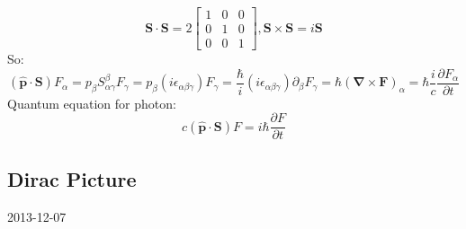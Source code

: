 \documentclass[12pt]{article}
\numberwithin{equation}{section}
\begin{document}
\begin{enumerate}
\begin{equation}
	\end{equation}
	\begin{equation}
		\bm{S}\cdot\bm{S}= 2\begin{bmatrix}1&0&0\\0&1&0\\0&0&1\end{bmatrix},
		\bm{S}\times\bm{S}= i\bm{S}
	\end{equation}
	So:
	\begin{equation}
		(\hat{\bm{p}}\cdot\bm{S})F_\alpha=p_\beta S^\beta_{\alpha\gamma}F_\gamma
		=p_\beta(i\epsilon_{\alpha\beta\gamma})F_\gamma
		=\frac{\hbar}{i}(i\epsilon_{\alpha\beta\gamma})\partial_\beta F_\gamma
		=\hbar(\bm{\nabla}\times\bm{F})_\alpha
		=\hbar\frac{i}{c}\frac{\partial F_\alpha}{\partial t}
	\end{equation}	
	Quantum equation for photon:
	\begin{equation}
		c(\hat{\bm{p}}\cdot\bm{S})F=i\hbar\frac{\partial F}{\partial t}
	\end{equation}
\end{enumerate}
\subsection{Dirac Picture}
2013-12-07
\end{document}
